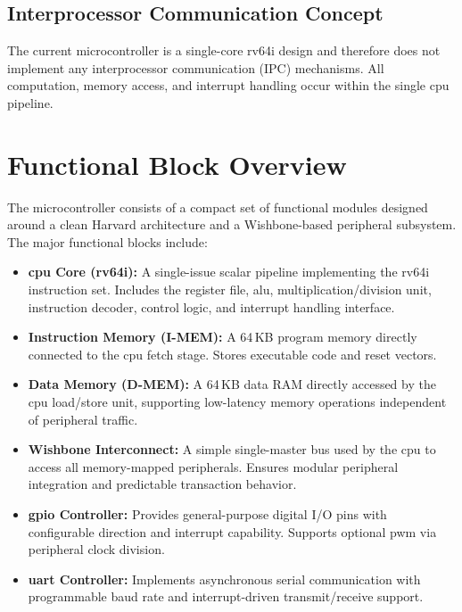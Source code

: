 \begin{itemize}
\subsection{Interprocessor Communication Concept} 

The current microcontroller is a single-core \gls{rv64i} design and therefore does not implement any 
interprocessor communication (IPC) mechanisms. All computation, memory access, and interrupt handling 
occur within the single \gls{cpu} \gls{pipeline}. 

\section{Functional Block Overview}
The microcontroller consists of a compact set of functional modules designed around a clean \gls{Harvard} 
architecture and a Wishbone-based peripheral subsystem. The major functional blocks include:

\begin{itemize}
  \item \textbf{\gls{cpu} Core (\gls{rv64i}):}  
        A single-issue scalar \gls{pipeline} implementing the \gls{rv64i} instruction set. Includes the register 
        file, \gls{alu}, multiplication/division unit, instruction decoder, control logic, and interrupt 
        handling interface.

  \item \textbf{Instruction Memory (\gls{I-MEM}):}  
        A 64\,KB program memory directly connected to the \gls{cpu} fetch stage. Stores executable code and 
        reset vectors.

  \item \textbf{Data Memory (\gls{D-MEM}):}  
        A 64\,KB data RAM directly accessed by the \gls{cpu} load/store unit, supporting low-latency memory 
        operations independent of peripheral traffic.

  \item \textbf{Wishbone Interconnect:}  
        A simple single-master bus used by the \gls{cpu} to access all memory-mapped peripherals. Ensures 
        modular peripheral integration and predictable transaction behavior.

  \item \textbf{\gls{gpio} Controller:}  
        Provides general-purpose digital I/O pins with configurable direction and interrupt capability. 
        Supports optional \gls{pwm} via peripheral clock division.

  \item \textbf{\gls{uart} Controller:}  
        Implements asynchronous serial communication with programmable baud rate and interrupt-driven 
        transmit/receive support.


\end{itemize}
\end{itemize}
